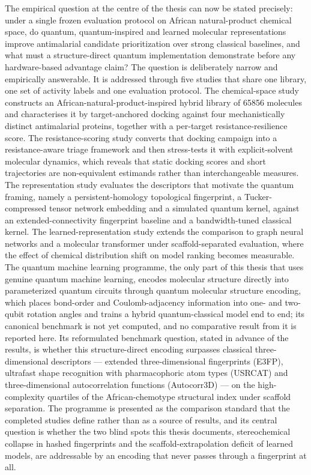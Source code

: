 The empirical question at the centre of the thesis can now be stated precisely: under a single frozen evaluation protocol on African natural-product chemical space, do quantum, quantum-inspired and learned molecular representations improve antimalarial candidate prioritization over strong classical baselines, and what must a structure-direct quantum implementation demonstrate before any hardware-based advantage claim? The question is deliberately narrow and empirically answerable. It is addressed through five studies that share one library, one set of activity labels and one evaluation protocol. The chemical-space study constructs an African-natural-product-inspired hybrid library of \num{65856} molecules and characterises it by target-anchored docking against four mechanistically distinct antimalarial proteins, together with a per-target resistance-resilience score. The resistance-scoring study converts that docking campaign into a resistance-aware triage framework and then stress-tests it with explicit-solvent molecular dynamics, which reveals that static docking scores and short trajectories are non-equivalent estimands rather than interchangeable measures. The representation study evaluates the descriptors that motivate the quantum framing, namely a persistent-homology topological fingerprint, a Tucker-compressed tensor network embedding and a simulated quantum kernel, against an extended-connectivity fingerprint baseline and a bandwidth-tuned classical kernel. The learned-representation study extends the comparison to graph neural networks and a molecular transformer under scaffold-separated evaluation, where the effect of chemical distribution shift on model ranking becomes measurable. The quantum machine learning programme, the only part of this thesis that uses genuine quantum machine learning, encodes molecular structure directly into parameterized quantum circuits through quantum molecular structure encoding, which places bond-order and Coulomb-adjacency information into one- and two-qubit rotation angles and trains a hybrid quantum-classical model end to end; its canonical benchmark is not yet computed, and no comparative result from it is reported here. Its reformulated benchmark question, stated in advance of the results, is whether this structure-direct encoding surpasses classical three-dimensional descriptors --- extended three-dimensional fingerprints (E3FP), ultrafast shape recognition with pharmacophoric atom types (USRCAT) and three-dimensional autocorrelation functions (Autocorr3D) --- on the high-complexity quartiles of the African-chemotype structural index under scaffold separation. The programme is presented as the comparison standard that the completed studies define rather than as a source of results, and its central question is whether the two blind spots this thesis documents, stereochemical collapse in hashed fingerprints and the scaffold-extrapolation deficit of learned models, are addressable by an encoding that never passes through a fingerprint at all.

